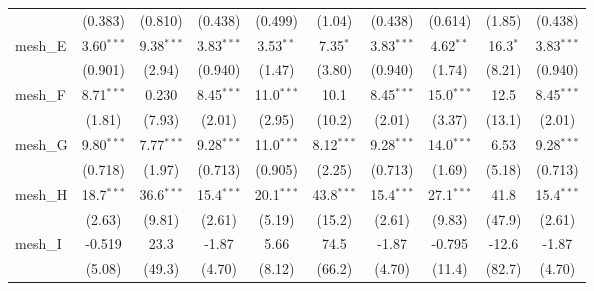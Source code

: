 \begin{tabular}{lccccccccc}
                                                               & (0.383)       & (0.810)       & (0.438)       & (0.499)       & (1.04)         & (0.438)       & (0.614)       & (1.85)        & (0.438)\\   
   mesh\_E                                                     & 3.60$^{***}$  & 9.38$^{***}$  & 3.83$^{***}$  & 3.53$^{**}$   & 7.35$^{*}$     & 3.83$^{***}$  & 4.62$^{**}$   & 16.3$^{*}$    & 3.83$^{***}$\\   
                                                               & (0.901)       & (2.94)        & (0.940)       & (1.47)        & (3.80)         & (0.940)       & (1.74)        & (8.21)        & (0.940)\\   
   mesh\_F                                                     & 8.71$^{***}$  & 0.230         & 8.45$^{***}$  & 11.0$^{***}$  & 10.1           & 8.45$^{***}$  & 15.0$^{***}$  & 12.5          & 8.45$^{***}$\\   
                                                               & (1.81)        & (7.93)        & (2.01)        & (2.95)        & (10.2)         & (2.01)        & (3.37)        & (13.1)        & (2.01)\\   
   mesh\_G                                                     & 9.80$^{***}$  & 7.77$^{***}$  & 9.28$^{***}$  & 11.0$^{***}$  & 8.12$^{***}$   & 9.28$^{***}$  & 14.0$^{***}$  & 6.53          & 9.28$^{***}$\\   
                                                               & (0.718)       & (1.97)        & (0.713)       & (0.905)       & (2.25)         & (0.713)       & (1.69)        & (5.18)        & (0.713)\\   
   mesh\_H                                                     & 18.7$^{***}$  & 36.6$^{***}$  & 15.4$^{***}$  & 20.1$^{***}$  & 43.8$^{***}$   & 15.4$^{***}$  & 27.1$^{***}$  & 41.8          & 15.4$^{***}$\\   
                                                               & (2.63)        & (9.81)        & (2.61)        & (5.19)        & (15.2)         & (2.61)        & (9.83)        & (47.9)        & (2.61)\\   
   mesh\_I                                                     & -0.519        & 23.3          & -1.87         & 5.66          & 74.5           & -1.87         & -0.795        & -12.6         & -1.87\\   
                                                               & (5.08)        & (49.3)        & (4.70)        & (8.12)        & (66.2)         & (4.70)        & (11.4)        & (82.7)        & (4.70)\\   

\end{tabular}
